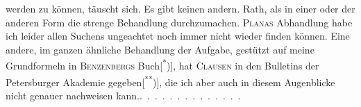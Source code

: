 werden zu können, täuscht sich. Es gibt keinen andern. Rath, als in einer
oder der anderen Form die strenge Behandlung durchzumachen. \textsc{Planas} Abhandlung
habe ich leider allen Suchens ungeachtet noch immer nicht wieder
finden können. Eine andere, im ganzen ähnliche Behandlung der Aufgabe,
gestützt auf meine Grundformeln in \textsc{Benzenbergs} Buch[\textsuperscript{*})]\begingroup\renewcommand{\thefootnote}{}\endgroup, hat \textsc{Clausen} in
den Bulletins der Petersburger Akademie gegeben[\textsuperscript{**})]\begingroup\renewcommand{\thefootnote}{}\endgroup, die ich aber auch in
diesem Augenblicke nicht genauer nachweisen kann.\quad .\ .\ .\ .\ .\ .\ .\ .\ .\ .\ .\ .\ .\ .
\clearpage\endgroup
